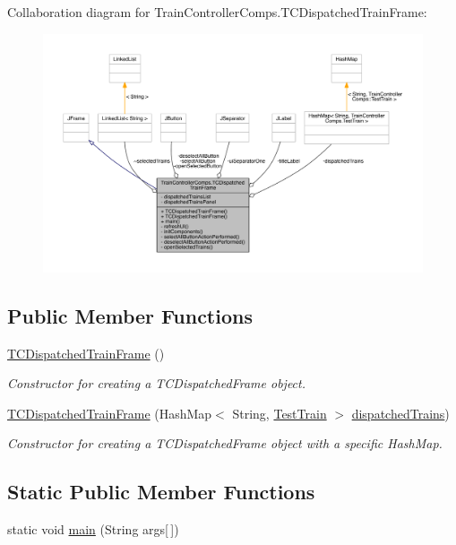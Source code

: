 Collaboration diagram for Train\+Controller\+Comps.\+T\+C\+Dispatched\+Train\+Frame\+:
\nopagebreak
\begin{figure}[H]
\begin{center}
\leavevmode
\includegraphics[width=350pt]{classTrainControllerComps_1_1TCDispatchedTrainFrame__coll__graph}
\end{center}
\end{figure}
\subsection*{Public Member Functions}
\begin{DoxyCompactItemize}
\item 
\hyperlink{classTrainControllerComps_1_1TCDispatchedTrainFrame_a4bbebc2384fba3774f4759096804e0b5}{T\+C\+Dispatched\+Train\+Frame} ()
\begin{DoxyCompactList}\small\item\em Constructor for creating a T\+C\+Dispatched\+Frame object. \end{DoxyCompactList}\item 
\hyperlink{classTrainControllerComps_1_1TCDispatchedTrainFrame_af9f9c9d89c8b5f62ed63f59e8514efe9}{T\+C\+Dispatched\+Train\+Frame} (Hash\+Map$<$ String, \hyperlink{classTrainControllerComps_1_1TestTrain}{Test\+Train} $>$ \hyperlink{classTrainControllerComps_1_1TCDispatchedTrainFrame_a4861a7d40d80d413c3eaf3d04b1c1856}{dispatched\+Trains})
\begin{DoxyCompactList}\small\item\em Constructor for creating a T\+C\+Dispatched\+Frame object with a specific Hash\+Map. \end{DoxyCompactList}\end{DoxyCompactItemize}
\subsection*{Static Public Member Functions}
\begin{DoxyCompactItemize}
\item 
static void \hyperlink{classTrainControllerComps_1_1TCDispatchedTrainFrame_aadd36928a24d8836ea28728d6e81ce67}{main} (String args\mbox{[}$\,$\mbox{]})
\end{DoxyCompactItemize}
